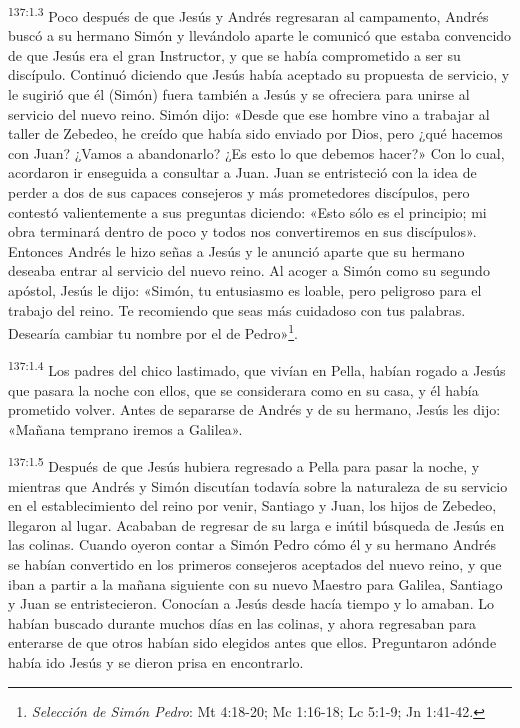 \par 
\textsuperscript{137:1.3} Poco después de que Jesús y Andrés regresaran al campamento, Andrés buscó a su hermano Simón y llevándolo aparte le comunicó que estaba convencido de que Jesús era el gran Instructor, y que se había comprometido a ser su discípulo. Continuó diciendo que Jesús había aceptado su propuesta de servicio, y le sugirió que él (Simón) fuera también a Jesús y se ofreciera para unirse al servicio del nuevo reino. Simón dijo: «Desde que ese hombre vino a trabajar al taller de Zebedeo, he creído que había sido enviado por Dios, pero ¿qué hacemos con Juan? ¿Vamos a abandonarlo? ¿Es esto lo que debemos hacer?» Con lo cual, acordaron ir enseguida a consultar a Juan. Juan se entristeció con la idea de perder a dos de sus capaces consejeros y más prometedores discípulos, pero contestó valientemente a sus preguntas diciendo: «Esto sólo es el principio; mi obra terminará dentro de poco y todos nos convertiremos en sus discípulos». Entonces Andrés le hizo señas a Jesús y le anunció aparte que su hermano deseaba entrar al servicio del nuevo reino. Al acoger a Simón como su segundo apóstol, Jesús le dijo: «Simón, tu entusiasmo es loable, pero peligroso para el trabajo del reino. Te recomiendo que seas más cuidadoso con tus palabras. Desearía cambiar tu nombre por el de Pedro»\footnote{\textit{Selección de Simón Pedro}: Mt 4:18-20; Mc 1:16-18; Lc 5:1-9; Jn 1:41-42.}.

\par 
\textsuperscript{137:1.4} Los padres del chico lastimado, que vivían en Pella, habían rogado a Jesús que pasara la noche con ellos, que se considerara como en su casa, y él había prometido volver. Antes de separarse de Andrés y de su hermano, Jesús les dijo: «Mañana temprano iremos a Galilea».

\par 
\textsuperscript{137:1.5} Después de que Jesús hubiera regresado a Pella para pasar la noche, y mientras que Andrés y Simón discutían todavía sobre la naturaleza de su servicio en el establecimiento del reino por venir, Santiago y Juan, los hijos de Zebedeo, llegaron al lugar. Acababan de regresar de su larga e inútil búsqueda de Jesús en las colinas. Cuando oyeron contar a Simón Pedro cómo él y su hermano Andrés se habían convertido en los primeros consejeros aceptados del nuevo reino, y que iban a partir a la mañana siguiente con su nuevo Maestro para Galilea, Santiago y Juan se entristecieron. Conocían a Jesús desde hacía tiempo y lo amaban. Lo habían buscado durante muchos días en las colinas, y ahora regresaban para enterarse de que otros habían sido elegidos antes que ellos. Preguntaron adónde había ido Jesús y se dieron prisa en encontrarlo.

